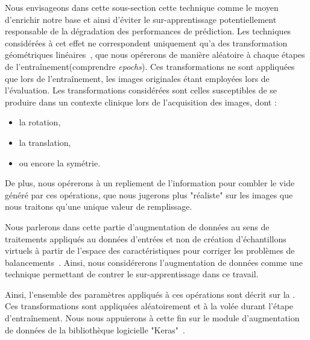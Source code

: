 Nous envisageons dans cette sous-section cette technique comme le moyen d'enrichir notre base et ainsi d'éviter le sur-apprentissage potentiellement responsable de la dégradation des performances de prédiction. Les techniques considérées à cet effet ne correspondent uniquement qu'a des transformation géométriques linéaires~\cite{Taylor2018}, que nous opérerons de manière aléatoire à chaque étapes de l'entraînement(comprendre \textit{epochs}). Ces transformations ne sont appliquées que lors de l'entraînement, les images originales étant employées lors de l'évaluation. Les transformations considérées sont celles susceptibles de se produire dans un contexte clinique lors de l'acquisition des images, dont :
\begin{itemize}
    \item la rotation,
    \item la translation,
    \item ou encore la symétrie.
\end{itemize} De plus, nous opérerons à un repliement de l'information pour combler le vide généré par ces opérations, que nous jugerons plus "réaliste" sur les images que nous traitons qu'une unique valeur de remplissage.\par

Nous parlerons dans cette partie d'augmentation de données au sens de traitements appliqués au données d'entrées et non de création d'échantillons virtuels à partir de l'espace des caractéristiques pour corriger les problèmes de balancements~\cite{Wong2016}. Ainsi, nous considérerons l'augmentation de données comme une technique permettant de contrer le sur-apprentissage dans ce travail.\par

Ainsi, l'ensemble des paramètres appliqués à ces opérations sont décrit sur la . Ces transformations sont appliquées aléatoirement et à la volée durant l'étape d'entraînement. Nous nous appuierons à cette fin sur le module d'augmentation de données de la bibliothèque logicielle "Keras"~\cite{chollet2015}.\par

